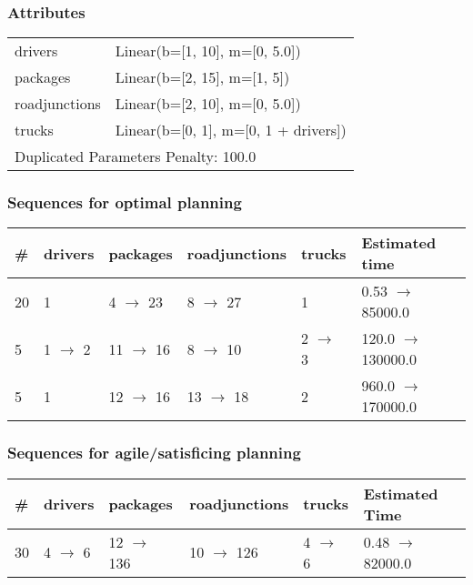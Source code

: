 \documentclass{article}
\begin{document}
                    \subsubsection*{Attributes}
                    \begin{tabular}{@{}p{}p{}@{}}
                    \toprule
                    drivers & Linear(b=[1, 10], m=[0, 5.0])\\
packages & Linear(b=[2, 15], m=[1, 5])\\
roadjunctions & Linear(b=[2, 10], m=[0, 5.0])\\
trucks & Linear(b=[0, 1], m=[0, 1 + drivers]) \\
                    \bottomrule
                    \multicolumn{2}{l}{Duplicated Parameters Penalty: 100.0}
                    \end{tabular}
                
                            \subsubsection*{Sequences for optimal planning}

                            \begin{center}
                            \begin{tabular}{@{}l|l|l|l|l|l@{}}
                            \# & drivers & packages & roadjunctions & trucks & Estimated time\\\midrule
                            20&1&4 $\rightarrow$ 23&8 $\rightarrow$ 27&1&0.53 $\rightarrow$ 85000.0\\
5&1 $\rightarrow$ 2&11 $\rightarrow$ 16&8 $\rightarrow$ 10&2 $\rightarrow$ 3&120.0 $\rightarrow$ 130000.0\\
5&1&12 $\rightarrow$ 16&13 $\rightarrow$ 18&2&960.0 $\rightarrow$ 170000.0
                            \end{tabular}
                            \end{center}
                    
                         \subsubsection*{Sequences for agile/satisficing planning}

                        \begin{center}
                        \begin{tabular}{@{}l|l|l|l|l|l@{}}
                        \# & drivers & packages & roadjunctions & trucks & Estimated Time\\\midrule
                        30&4 $\rightarrow$ 6&12 $\rightarrow$ 136&10 $\rightarrow$ 126&4 $\rightarrow$ 6&0.48 $\rightarrow$ 82000.0
                        \end{tabular}
                        \end{center}
                    
\end{document}
